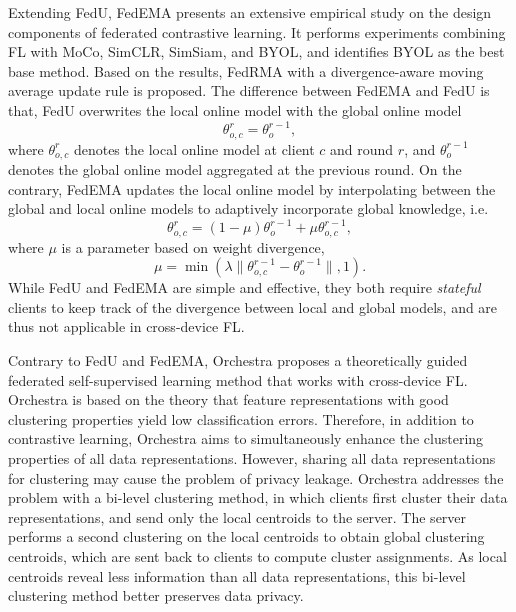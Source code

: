 \documentclass[11pt]{article}
\begin{document}
Extending FedU, FedEMA \cite{Yilun-zhuang2022divergence} presents an extensive empirical study on the design components of federated contrastive learning. It performs experiments combining FL with MoCo, SimCLR, SimSiam, and BYOL, and identifies BYOL as the best base method. Based on the results, FedRMA with a divergence-aware moving average update rule is proposed. The difference between FedEMA and FedU is that, FedU overwrites the local online model with the global online model
\begin{equation}
    \theta_{o, c}^{r} = \theta_{o}^{r-1},
\end{equation}
where $\theta_{o, c}^r$ denotes the local online model at client $c$ and round $r$, and $\theta_o^{r-1}$ denotes the global online model aggregated at the previous round. On the contrary, FedEMA updates the local online model by interpolating between the global and local online models to adaptively incorporate global knowledge, i.e.
\begin{equation}
    \theta_{o, c}^r = (1-\mu)\theta_{o}^{r-1} + \mu \theta_{o,c}^{r-1},
\end{equation}
where $\mu$ is a parameter based on weight divergence,
\begin{equation}
    \mu = \min (\lambda\|\theta_{o, c}^{r-1}-\theta_o^{r-1}\|, 1).
\end{equation}
While FedU and FedEMA are simple and effective, they both require \textit{stateful} clients to keep track of the divergence between local and global models, and are thus not applicable in cross-device FL.

Contrary to FedU and FedEMA, Orchestra \cite{Yilun-lubana2022orchestra} proposes a theoretically guided federated self-supervised learning method that works with cross-device FL. Orchestra is based on the theory that feature representations with good clustering properties yield low classification errors. Therefore, in addition to contrastive learning, Orchestra aims to simultaneously enhance the clustering properties of all data representations. However, sharing all data representations for clustering may cause the problem of privacy leakage. Orchestra addresses the problem with a bi-level clustering method, in which clients first cluster their data representations, and send only the local centroids to the server. The server performs a second clustering on the local centroids to obtain global clustering centroids, which are sent back to clients to compute cluster assignments. As local centroids reveal less information than all data representations, this bi-level clustering method better preserves data privacy.
\end{document}
